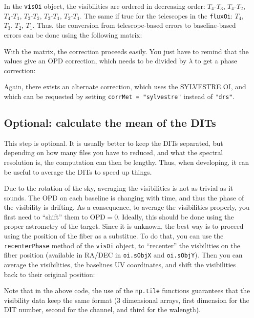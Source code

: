In the \verb|visOi| object, the visibilities are ordered in decreasing order: $T_4$-$T_3$, $T_4$-$T_2$, $T_4$-$T_1$, $T_3$-$T_2$, $T_3$-$T_1$, $T_2$-$T_1$. The same if true for the telescopes in the \verb|fluxOi|: $T_4$, $T_3$, $T_2$, $T_1$. Thus, the conversion from telescope-based errors to baseline-based errors can be done using the following matrix:


With the matrix, the correction proceeds easily. You just have to remind that the values give an OPD correction, which needs to be divided by $\lambda$ to get a phase correction:


Again, there exists an alternate correction, which uses the SYLVESTRE OI, and which can be requested by setting \verb|corrMet = "sylvestre"| instead of \verb|"drs"|.

\subsection{Optional: calculate the mean of the DITs}

This step is optional. It is usually better to keep the DITs separated, but depending on how many files you have to reduced, and what the spectral resolution is, the computation can then be lengthy. Thus, when developing, it can be useful to average the DITs to speed up things.

Due to the rotation of the sky, averaging the visibilities is not as trivial as it sounds. The OPD on each baseline is changing with time, and thus the phase of the visibility is drifting. As a consequence, to average the visibilities properly, you first need to ``shift'' them to $\mathrm{OPD} = 0$. Ideally, this should be done using the proper astrometry of the target. Since it is unknown, the best way is to proceed using the position of the fiber as a substitue. To do that, you can use the \verb|recenterPhase| method of the \verb|visOi| object, to ``recenter'' the visbilities on the fiber position (available in RA/DEC in \verb|oi.sObjX| and \verb|oi.sObjY|). Then you can average the visibilities, the baselines UV coordinates, and shift the visibilities back to their original position:


Note that in the above code, the use of the \verb|np.tile| functions guarantees that the visibility data keep the same format (3 dimensional arrays, first dimension for the DIT number, second for the channel, and third for the walength).

